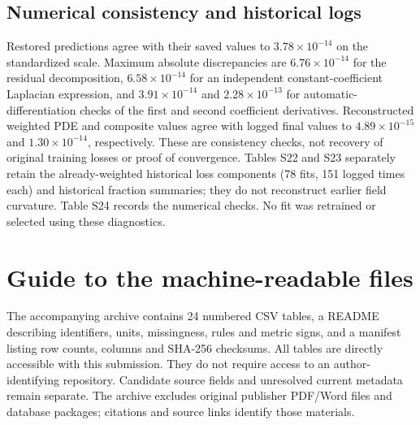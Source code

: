 \documentclass[11pt,a4paper]{article}
\begin{document}
\subsection*{Numerical consistency and historical logs}
Restored predictions agree with their saved values to $3.78\times10^{-14}$ on the standardized scale. Maximum absolute discrepancies are $6.76\times10^{-14}$ for the residual decomposition, $6.58\times10^{-14}$ for an independent constant-coefficient Laplacian expression, and $3.91\times10^{-14}$ and $2.28\times10^{-13}$ for automatic-differentiation checks of the first and second coefficient derivatives. Reconstructed weighted PDE and composite values agree with logged final values to $4.89\times10^{-15}$ and $1.30\times10^{-14}$, respectively. These are consistency checks, not recovery of original training losses or proof of convergence. Tables S22 and S23 separately retain the already-weighted historical loss components (78 fits, 151 logged times each) and historical fraction summaries; they do not reconstruct earlier field curvature. Table S24 records the numerical checks. No fit was retrained or selected using these diagnostics.

\section*{Guide to the machine-readable files}
The accompanying archive contains 24 numbered CSV tables, a README describing identifiers, units, missingness, rules and metric signs, and a manifest listing row counts, columns and SHA-256 checksums. All tables are directly accessible with this submission. They do not require access to an author-identifying repository. Candidate source fields and unresolved current metadata remain separate. The archive excludes original publisher PDF/Word files and database packages; citations and source links identify those materials.



\end{document}
